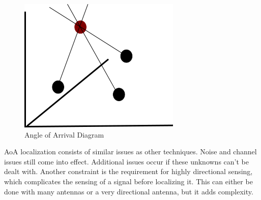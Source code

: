 \begin{figure}[ht]
\centering
\includegraphics[scale=0.5]{img/path4188.png}
\caption{Angle of Arrival Diagram}
\label{fig:aoa_diagram}
\end{figure}\par
AoA localization consists of similar issues as other techniques. Noise and channel issues still come into effect. Additional issues occur if these unknowns can’t be dealt with. Another constraint is the requirement for highly directional sensing, which complicates the sensing of a signal before localizing it. This can either be done with many antennas or a very directional antenna, but it adds complexity.

